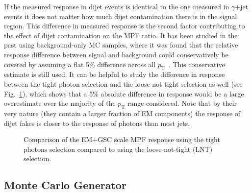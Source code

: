 If the measured response in dijet events is identical to the one measured in $\gamma$+jet events it does not matter how much dijet contamination there is in the signal region.  
This difference in measured response is the second factor contributing to the effect of dijet contamination on the MPF ratio.  
It has been studied in the past using background-only MC samples, where it was found that the relative response difference between signal and background could conservatively be covered by assuming a flat 5\% difference across all $p_{\mathrm T}$~\cite{ATLAS-CONF-2012-063}.  
This conservative estimate is still used.  
It can be helpful to study the difference in response between the tight photon selection and the loose-not-tight selection as well (see Fig.~\ref{fig:RespTightLNTEMGSC}), which shows that a 5\% absolute difference in response would be a large overestimate over the majority of the $p_{\mathrm T}$ range considered.  
Note that by their very nature (they contain a larger fraction of EM components) the response of dijet fakes is closer to the response of photons than most jets.   


\begin{figure}[!ht]
 \begin{center}
 \end{center}
 \caption[Response using tight photons compared to using loose-not-tight photons, EM+GSC scale]
 {\small Comparison of the EM+GSC scale MPF response using the tight photons selection compared to using the loose-not-tight (LNT) selection.  }
 \label{fig:RespTightLNTEMGSC}
\end{figure}

\subsection{Monte Carlo Generator}

